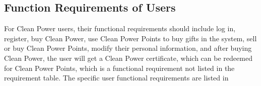 \subsection{Function Requirements of Users}
For Clean Power users, their functional requirements should include log in, register, buy Clean Power, use Clean Power Points to buy gifts in the system, sell or buy Clean Power Points, modify their personal information, and after buying Clean Power, the user will get a Clean Power certificate, which can be redeemed for Clean Power Points, which is a functional requirement not listed in the requirement table. The specific user functional requirements are listed in 
